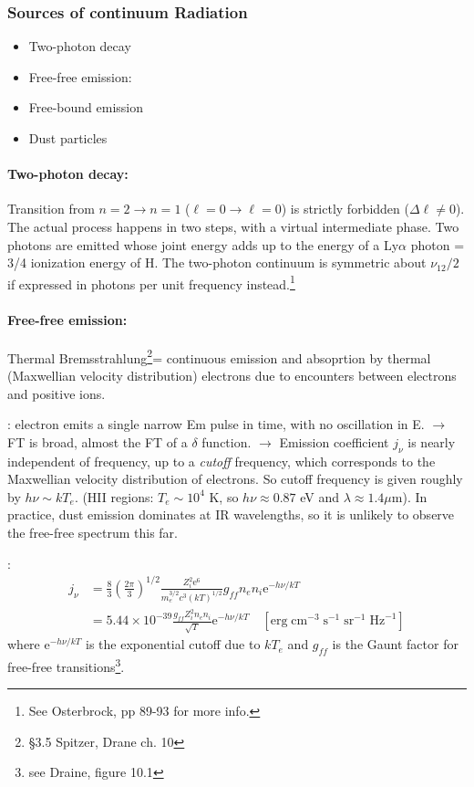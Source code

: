 \documentclass[11pt]{article}
\newcommand{\mar}[1]{\hspace{0pt}\marginpar{-\textcolor{black}{#1}-}}
\begin{document}
\subsubsection{Sources of continuum Radiation}
\begin{itemize}
    \item \mar{63}Two-photon decay
    \item Free-free emission:
    \item Free-bound emission
    \item Dust particles
\end{itemize}

\paragraph{Two-photon decay:}
Transition from $n=2 \rightarrow n=1$ ($\ell=0 \rightarrow \ell=0$) is strictly
forbidden ($\Delta\ell \neq 0$). The actual process happens in two steps, with
a virtual intermediate phase. Two photons are emitted whose joint energy adds
up to the energy of a Ly$\alpha$ photon = 3/4 ionization energy of H. The
two-photon continuum is symmetric about $\nu_{12}/2$ if expressed in photons
per unit frequency instead.\footnote{See Osterbrock, pp 89-93 for more info.}

\paragraph{Free-free emission:}
Thermal Bremsstrahlung\footnote{ \S{3.5}
Spitzer, Drane ch. 10}= continuous emission and absoprtion by thermal
(Maxwellian velocity distribution) electrons due to encounters between
electrons and positive ions.

\underline{}: electron emits a single narrow Em pulse
in time, with no oscillation in E. $\rightarrow$ FT is broad, almost
the FT of a $\delta$ function. $\rightarrow$ Emission coefficient
$j_{\nu}$ is nearly independent of frequency, up to a \emph{cutoff}
frequency, which corresponds to the Maxwellian velocity distribution of
electrons. \mar{64}So cutoff frequency is given roughly by $h\nu \sim
kT_{e}$. (HII regions: $T_{e} \sim 10^{4}$ K, so $h\nu \approx 0.87$ eV
and $\lambda \approx 1.4 \mu$m). In practice, dust emission dominates at
IR wavelengths, so it is unlikely to observe the free-free spectrum
this far.

\underline{}:
\begin{align*}
    j_{\nu} &= \frac{8}{3}\left(\frac{2\pi}{3}\right)^{1/2}
    \frac{Z_{i}^{2}\mathrm{e}^{6}}{m_{e}^{3/2}c^{3}(kT)^{1/2}}
    g_{ff}n_{e}n_{i}\mathrm{e}^{-h\nu/kT}\\
    &= 5.44\times10^{-39}\frac{g_{ff}Z_{i}^{2}n_{e}n_{i}}{\sqrt{T}}
    \mathrm{e}^{-h\nu/kT}\quad
    [\mathrm{erg}\;\mathrm{cm}^{-3}\;\mathrm{s}^{-1}\;\mathrm{sr}^{-1}\;\mathrm{Hz}^{-1}]
\end{align*}
where $\mathrm{e}^{-h\nu/kT}$ is the exponential cutoff due to $kT_{e}$
and $g_{ff}$ is the Gaunt factor for free-free transitions\footnote{see
Draine, figure 10.1}.
\end{document}
